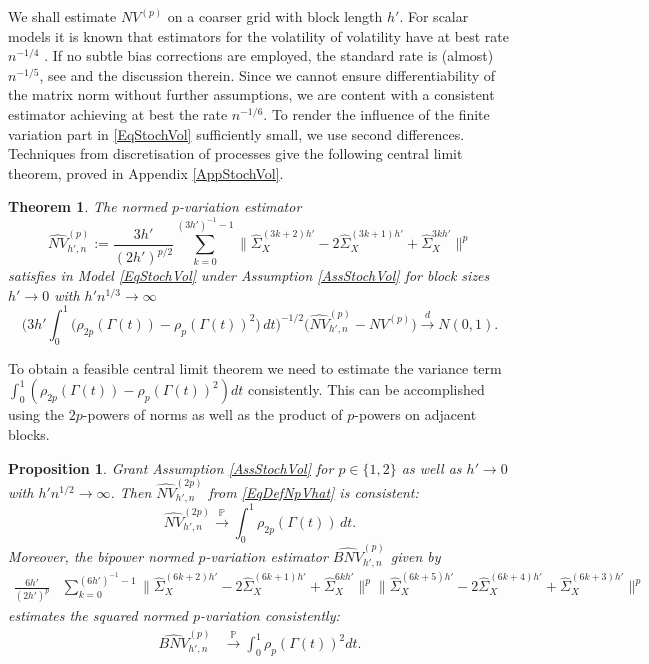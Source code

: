 \documentclass[preprint,aos]{imsart}
\numberwithin{equation}{section}
\newtheorem{theorem}[satz]{Theorem}
\newtheorem{proposition}[satz]{Proposition}
\theoremstyle{remark}
\DeclareMathOperator{\PP}{{\mathbb P}}
\providecommand{\norm}[1]{\lVert #1 \rVert}
\begin{document}
We shall estimate $NV^{(p)}$ on a coarser grid with block length $h'$. For scalar models it is known that estimators for the volatility of volatility have at best rate $n^{-1/4}$ \citep{Hoffmann2002}. If no subtle bias corrections are employed, the standard rate is (almost) $n^{-1/5}$, see \citet{Vetter2015} and the discussion therein. Since we cannot ensure differentiability of the matrix norm without further assumptions, we are content with a consistent estimator achieving at best the rate $n^{-1/6}$.  To render the influence of the finite variation part in \eqref{EqStochVol} sufficiently small, we use  second differences. Techniques from discretisation of processes give the following central limit theorem, proved in Appendix \ref{AppStochVol}.

\begin{theorem}\label{ThmNQVCLT}
The normed $p$-variation estimator
\begin{equation}\label{EqDefNpVhat}
 \widehat{NV}^{(p)}_{h',n}:=\frac{3h'}{(2h')^{p/2}}\sum_{k=0}^{(3h')^{-1}-1} \norm{\hat\Sigma_X^{(3k+2)h'}-2\hat\Sigma_X^{(3k+1)h'}+\hat\Sigma_X^{3kh'}}^p
 \end{equation}
satisfies in Model \eqref{EqStochVol} under Assumption \ref{AssStochVol} for block sizes $h'\to 0$ with $h'n^{1/3}\to\infty$
\[ \Big(3h'\int_0^1 \big(\rho_{2p}(\Gamma(t))-\rho_p(\Gamma(t))^2\big)\,dt\Big)^{-1/2}\Big(\widehat{NV}^{(p)}_{h',n}-NV^{(p)}\Big) \xrightarrow{d} N(0,1).
\]
\end{theorem}



To obtain a feasible central limit theorem we need to estimate the variance term $\int_0^1 (\rho_{2p}(\Gamma(t))-\rho_p(\Gamma(t))^2)dt$ consistently. This can be accomplished using the $2p$-powers of norms as well as the product of $p$-powers on adjacent blocks.

\begin{proposition}\label{PropVarhat}
Grant Assumption \ref{AssStochVol} for $p\in\{1,2\}$ as well as $h'\to 0$ with $h'n^{1/2}\to\infty$. Then $\widehat{NV}_{h',n}^{(2p)}$ from \eqref{EqDefNpVhat}  is consistent:
\[ \widehat{NV}_{h',n}^{(2p)} \xrightarrow{\PP} \int_0^1\rho_{2p}(\Gamma(t))\,dt.
\]
Moreover, the bipower normed $p$-variation estimator $\widehat{BNV}^{(p)}_{h',n}$ given by
\begin{align*}
\frac{6h'}{(2h')^p}&\sum_{k=0}^{(6h')^{-1}-1} \norm{\hat\Sigma_X^{(6k+2)h'}-2\hat\Sigma_X^{(6k+1)h'}+\hat\Sigma_X^{6kh'}}^p \norm{\hat\Sigma_X^{(6k+5)h'}-2\hat\Sigma_X^{(6k+4)h'}+\hat\Sigma_X^{(6k+3)h'}}^p
\end{align*}
estimates the squared normed $p$-variation consistently:
\begin{align*}
\widehat{BNV}^{(p)}_{h',n}
& \xrightarrow{\PP} \int_0^1\rho_p(\Gamma(t))^2dt.
\end{align*}
\end{proposition}
\end{document}
